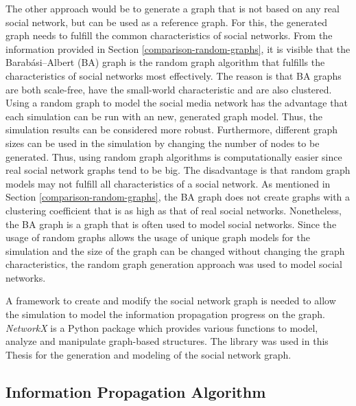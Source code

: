 The other approach would be to generate a graph that is not based
on any real social network, but can be used as a reference graph.
For this, the generated graph needs to fulfill the common
characteristics of social networks.
From the information provided in Section \ref{comparison-random-graphs}, 
it is visible that the Barabási–Albert (BA) graph is the random graph 
algorithm that fulfills the characteristics of social networks most effectively.
The reason is that BA graphs are both scale-free, have the small-world
characteristic and are also clustered.
Using a random graph to model the social media network has the advantage
that each simulation can be run with an new, generated graph model. 
Thus, the simulation results can be considered more robust. 
Furthermore, different graph sizes can be 
used in the simulation by changing the number of nodes to be generated.
Thus, using random graph algorithms is computationally easier since 
real social network graphs tend to be big.
The disadvantage is that random graph models may not fulfill
all characteristics of a social network. As mentioned in 
Section \ref{comparison-random-graphs}, the BA graph
does not create graphs with a clustering coefficient that is as 
high as that of real social networks. Nonetheless, the BA graph is
a graph that is often used to model social networks.
Since the usage of random graphs allows the usage
of unique graph models for the simulation and the size of the 
graph can be changed without changing the graph characteristics, 
the random graph generation approach was used to model social networks.

A framework to create and modify the social network graph is needed to 
allow the simulation to model the information propagation
progress on the graph. \textit{NetworkX} is a 
Python package which provides various functions to model,
analyze and manipulate graph-based structures. 
The library was used in this Thesis for
the generation and modeling of the social network graph.

\subsection{Information Propagation Algorithm}
\label{modelinformationdiffusion}

